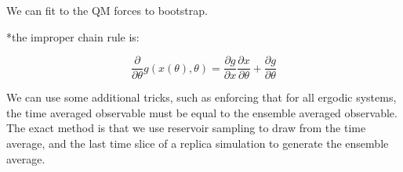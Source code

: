 \documentclass{article}
\begin{document}
We can fit to the QM forces to bootstrap.

*the improper chain rule is:

\begin{equation}
\dfrac{\partial}{\partial \theta}g(x(\theta), \theta) = \dfrac{\partial g}{\partial x}\dfrac{\partial x}{\partial \theta} + \dfrac{\partial g}{\partial\theta}
\end{equation}

We can use some additional tricks, such as enforcing that for all ergodic systems, the time averaged observable must be equal to the ensemble averaged observable. The exact method is that we use reservoir sampling to draw from the time average, and the last time slice of a replica simulation to generate the ensemble average.
\end{document}
